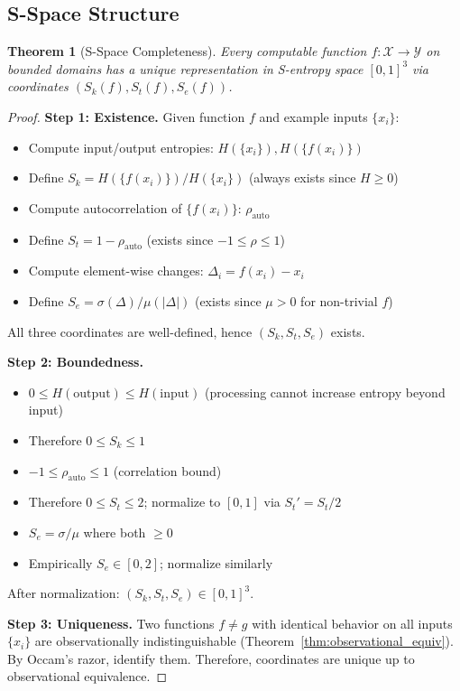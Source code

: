 \documentclass[twocolumn,10pt]{article}
\newtheorem{theorem}{Theorem}[section]
\theoremstyle{definition}
\theoremstyle{remark}
\newcommand{\Sk}{S_k}
\newcommand{\St}{S_t}
\newcommand{\Se}{S_e}
\begin{document}
\subsection{S-Space Structure}

\begin{theorem}[S-Space Completeness]
\label{thm:s_space_structure}
Every computable function $f: \mathcal{X} \to \mathcal{Y}$ on bounded domains has a unique representation in S-entropy space $[0,1]^3$ via coordinates $(\Sk(f), \St(f), \Se(f))$.
\end{theorem}

\begin{proof}
\textbf{Step 1: Existence.} Given function $f$ and example inputs $\{x_i\}$:

\begin{itemize}
\item Compute input/output entropies: $H(\{x_i\}), H(\{f(x_i)\})$
\item Define $\Sk = H(\{f(x_i)\}) / H(\{x_i\})$ (always exists since $H \geq 0$)
\item Compute autocorrelation of $\{f(x_i)\}$: $\rho_{\text{auto}}$
\item Define $\St = 1 - \rho_{\text{auto}}$ (exists since $-1 \leq \rho \leq 1$)
\item Compute element-wise changes: $\Delta_i = f(x_i) - x_i$
\item Define $\Se = \sigma(\Delta) / \mu(|\Delta|)$ (exists since $\mu > 0$ for non-trivial $f$)
\end{itemize}

All three coordinates are well-defined, hence $(\Sk, \St, \Se)$ exists.

\vspace{0.2cm}
\noindent\textbf{Step 2: Boundedness.}
\begin{itemize}
\item $0 \leq H(\text{output}) \leq H(\text{input})$ (processing cannot increase entropy beyond input)
\item Therefore $0 \leq \Sk \leq 1$
\item $-1 \leq \rho_{\text{auto}} \leq 1$ (correlation bound)
\item Therefore $0 \leq \St \leq 2$; normalize to $[0,1]$ via $\St' = \St/2$
\item $\Se = \sigma/\mu$ where both $\geq 0$
\item Empirically $\Se \in [0, 2]$; normalize similarly
\end{itemize}

After normalization: $(\Sk, \St, \Se) \in [0,1]^3$.

\vspace{0.2cm}
\noindent\textbf{Step 3: Uniqueness.} Two functions $f \neq g$ with identical behavior on all inputs $\{x_i\}$ are observationally indistinguishable (Theorem~\ref{thm:observational_equiv}). By Occam's razor, identify them. Therefore, coordinates are unique up to observational equivalence.
\end{proof}
\end{document}
